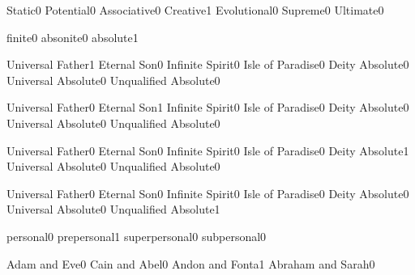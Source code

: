   {Static}{0}
  {Potential}{0}
  {Associative}{0}
  {Creative}{1}
  {Evolutional}{0}
  {Supreme}{0}
  {Ultimate}{0}
\qstop


  {finite}{0}
  {absonite}{0}
  {absolute}{1}
\qstop


  {Universal Father}{1}
  {Eternal Son}{0}
  {Infinite Spirit}{0}
  {Isle of Paradise}{0}
  {Deity Absolute}{0}
  {Universal Absolute}{0}
  {Unqualified Absolute}{0}
\qstop

  {Universal Father}{0}
  {Eternal Son}{1}
  {Infinite Spirit}{0}
  {Isle of Paradise}{0}
  {Deity Absolute}{0}
  {Universal Absolute}{0}
  {Unqualified Absolute}{0}
\qstop

  {Universal Father}{0}
  {Eternal Son}{0}
  {Infinite Spirit}{0}
  {Isle of Paradise}{0}
  {Deity Absolute}{1}
  {Universal Absolute}{0}
  {Unqualified Absolute}{0}
\qstop

  {Universal Father}{0}
  {Eternal Son}{0}
  {Infinite Spirit}{0}
  {Isle of Paradise}{0}
  {Deity Absolute}{0}
  {Universal Absolute}{0}
  {Unqualified Absolute}{1}
\qstop


  {personal}{0}
  {prepersonal}{1}
  {superpersonal}{0}
  {subpersonal}{0}
\qstop



  {Adam and Eve}{0}
  {Cain and Abel}{0}
  {Andon and Fonta}{1}
  {Abraham and Sarah}{0}
\qstop

